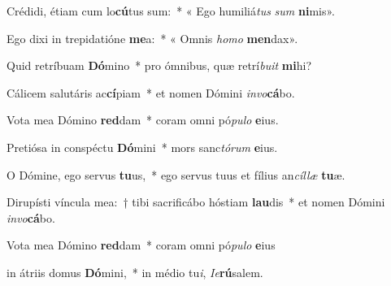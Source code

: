 \item Crédidi, étiam cum lo\textbf{cú}tus sum:~* « Ego humiliá\textit{tus} \textit{sum} \textbf{ni}mis».

\item Ego dixi in trepidatióne \textbf{me}a:~* « Omnis \textit{homo} \textbf{men}dax».

\item Quid retríbuam \textbf{Dó}mino~* pro ómnibus, quæ retrí\textit{buit} \textbf{mi}hi?

\item Cálicem salutáris ac\textbf{cí}piam~* et nomen Dómini \textit{invo}\textbf{cá}bo.

\item Vota mea Dómino \textbf{red}dam~* coram omni pó\textit{pulo} \textbf{e}ius.

\item Pretiósa in conspéctu \textbf{Dó}mini~* mors sanc\textit{tórum} \textbf{e}ius.

\item O Dómine, ego servus \textbf{tu}us,~* ego servus tuus et fílius an\textit{cíllæ} \textbf{tu}æ.

\item Dirupísti víncula mea:~† tibi sacrificábo hóstiam \textbf{lau}dis~* et nomen Dómini \textit{invo}\textbf{cá}bo.

\item Vota mea Dómino \textbf{red}dam~* coram omni pó\textit{pulo} \textbf{e}ius

\item in átriis domus \textbf{Dó}mini,~* in médio tu\textit{i}, \textit{Ie}\textbf{rú}salem.
